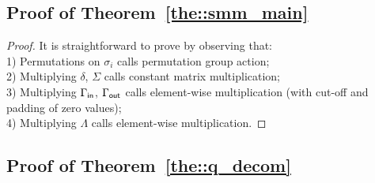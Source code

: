 \subsection{Proof of Theorem~\ref{the::smm_main}}
\label{sec::proof_smm}
\iffalse
\begin{theorem}[Restatement of Theorem~\ref{the::smm_main}]
Let $\Msf$ be a sparse matrix and $\xvec$ be a dense vector/matrix.
Computing sparse matrix multiplication that $\Msf\xvec=\sigma_5 \delta _m ^\top \Gamma _{\nrow} \sigma _4 \Sigma ^\top \Lambda \sigma _3 \Sigma \sigma_2 J_{\ncol} \delta _n \sigma _1 \xvec$ requires an ordered sequential of permutation group action, element-wise multiplication, cut-off and padding with $0$, and constant matrix multiplication from right to left.
\end{theorem}
\fi
\begin{proof}
It is straightforward to prove by observing that:\\
1) Permutations on $\sigma _i$ calls permutation group action;\\
2) Multiplying %
$\delta$, $\Sigma$ calls constant matrix multiplication;\\
3) Multiplying $\Gamma_{\mathsf{in}}$, $\Gamma_{\mathsf{out}}$ calls element-wise multiplication (with cut-off and padding of zero values);\\
4) Multiplying $\Lambda$ calls element-wise multiplication.	
\end{proof}

\subsection{Proof of Theorem~\ref{the::q_decom}}


\label{sec::proof_q}


